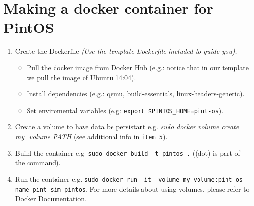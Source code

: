 \documentclass[12pt]{article}
\begin{document}
\maketitle

\section{Making a docker container for PintOS}

\begin{enumerate}
	\item Create the Dockerfile \textit{(Use the template Dockerfile included to guide you).}
	\begin{itemize}
		\item Pull the docker image from Docker Hub (e.g.: notice that in our template we pull the image of Ubuntu 14:04).
		\item Install dependencies (e.g.: qemu, build-essentials, linux-headers-generic).
		\item Set enviromental variables (e.g: \texttt{export \$PINTOS\_HOME=\/pint-os\/}).
	\end{itemize}
	\item Create a volume to have data be persistant e.g. \textit{sudo docker volume create my\_volume PATH} (see additional info in \texttt{item 5}).
	
	\item Build the container e.g. \texttt{sudo docker build -t pintos .} ((dot) is part of the command).
	\item Run the container e.g. \texttt{sudo docker run -it --volume my\_volume:\/pint-os --name pint-sim pintos}. For more details about using volumes, please refer to \href{https://docs.docker.com/storage/volumes/}{Docker Documentation}.
	
\end{enumerate}
\end{document}
